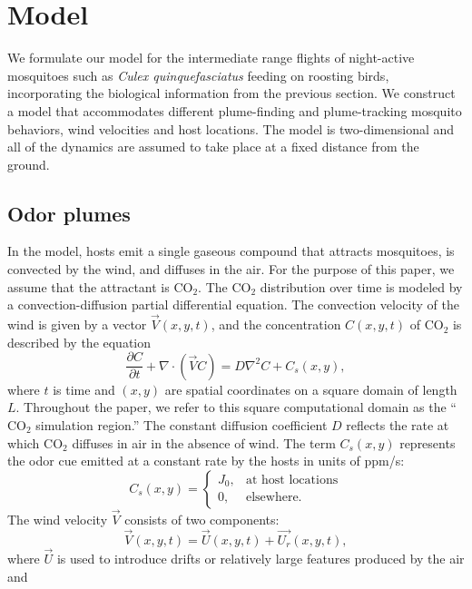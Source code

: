 \documentclass[10pt]{article}
\begin{document}
\section*{Model}

We formulate our model for the intermediate range flights of night-active mosquitoes such as \textit{Culex quinquefasciatus} feeding on roosting birds, incorporating the biological information from the previous section.   We construct a model that accommodates different plume-finding and plume-tracking mosquito behaviors, wind velocities and host locations.  The model is two-dimensional and all of the dynamics are assumed to take place at a fixed distance from the ground.


\subsection*{Odor plumes}
In the model, hosts emit a single gaseous compound that attracts mosquitoes, is convected by the wind,
and diffuses in the air. For the purpose of this paper, we assume that the attractant is $\mbox{CO}_2$.
The $\mbox{CO}_2$ distribution over time is modeled by a convection-diffusion partial differential equation.  The convection velocity of the wind is given by
a vector ${\vec V}(x,y,t)$, and the concentration $C(x,y,t)$ of $\mbox{CO}_2$ is described by the  equation
\begin{equation}\label{eq:conv-diff}
\frac{\partial C}{\partial t} + \nabla\cdot ( {\vec V} C ) = D\nabla^2 C + C_s(x,y),
\end{equation}
where $t$ is time and $(x,y)$ are spatial coordinates on a square domain of length $L$. Throughout the paper, we refer to this square computational domain as the ``$\mbox{CO}_2$ simulation region.'' The constant diffusion coefficient $D$ reflects the rate at which $\mbox{CO}_2$ diffuses in air in the absence of wind.
The term $C_s(x,y)$ represents the odor
cue emitted at a constant rate by the hosts in units of ppm/s:
\begin{equation*}
C_s(x,y) = \left\{ \begin{array}{cc} J_0, & \mbox{at host locations} \\ 0, & \mbox{elsewhere.} \end{array} \right . 
\end{equation*}
%
The wind velocity $\vec{V}$ consists of two components: 
\[
\vec{V}(x,y,t) = \vec{U}(x,y,t) + \vec{U_r}(x,y,t),
\]
where $\vec{U}$ is used to introduce drifts or
relatively large features produced by the air and
\end{document}
